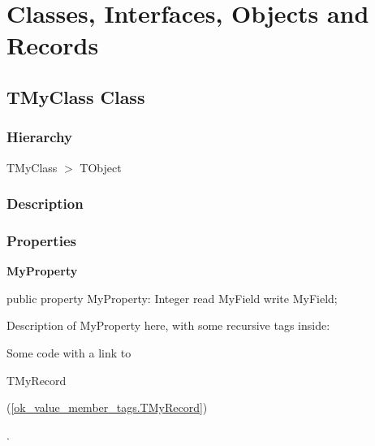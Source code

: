 \documentclass{report}
\newif\ifpdf
\begin{document}
\section{Classes, Interfaces, Objects and Records}
\ifpdf
\subsection*{\large{\textbf{TMyClass Class}}\normalsize\hspace{1ex}\hrulefill}
\else
\subsection*{TMyClass Class}
\fi
\label{ok_value_member_tags.TMyClass}
\subsubsection*{\large{\textbf{Hierarchy}}\normalsize\hspace{1ex}\hfill}
TMyClass {$>$} TObject
\subsubsection*{\large{\textbf{Description}}\normalsize\hspace{1ex}\hfill}
  \subsubsection*{\large{\textbf{Properties}}\normalsize\hspace{1ex}\hfill}
\begin{list}{}{
\setlength{\itemindent}{0cm}
\setlength{\listparindent}{0cm}
\setlength{\leftmargin}{\evensidemargin}
\addtolength{\leftmargin}{\tmplength}
\settowidth{\labelsep}{X}
\addtolength{\leftmargin}{\labelsep}
\setlength{\labelwidth}{\tmplength}
}
\label{ok_value_member_tags.TMyClass-MyProperty}
\item[\textbf{MyProperty}\hfill]
\ifpdf
\begin{flushleft}
\fi
\begin{ttfamily}
public property MyProperty: Integer read MyField write MyField;\end{ttfamily}

\ifpdf
\end{flushleft}
\fi


\par Description of MyProperty here, with some recursive tags inside: \begin{ttfamily}Some code with a link to \begin{ttfamily}TMyRecord\end{ttfamily}(\ref{ok_value_member_tags.TMyRecord})\end{ttfamily}.\end{list}
\end{document}
